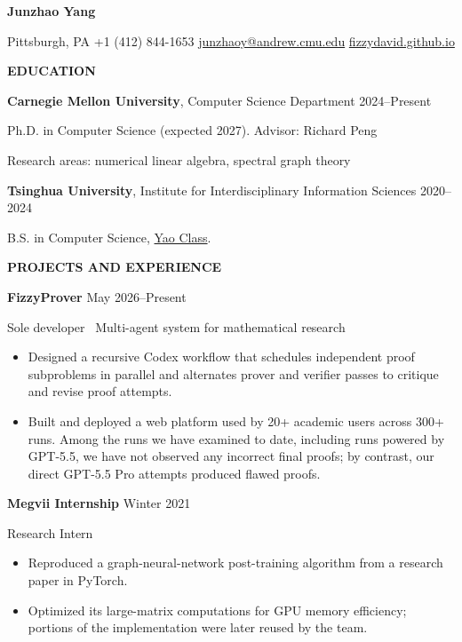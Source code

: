 \documentclass[11pt,letterpaper]{article}
\newcommand{\ressection}[1]{%
  \par\vspace{6pt}
  {\color{accent}\bfseries\fontsize{10.5}{12.5}\selectfont\MakeUppercase{#1}}\par
  \vspace{2pt}{\color{rulecolor}\hrule height 0.5pt}\vspace{4pt}
}
\newcommand{\resdate}[1]{{\small\color{muted}#1}}
\begin{document}
{\fontsize{20}{23}\selectfont\bfseries Junzhao Yang}\par
\vspace{3pt}
{
\small Pittsburgh, PA \enspace\textbar\enspace
+1 (412) 844-1653
  \enspace\textbar\enspace \href{mailto:junzhaoy@andrew.cmu.edu}{junzhaoy@andrew.cmu.edu}
  \enspace\textbar\enspace \href{https://fizzydavid.github.io/}{fizzydavid.github.io}}\par

\ressection{Education}
\textbf{Carnegie Mellon University}, Computer Science Department
\hfill \resdate{2024--Present}\par
Ph.D. in Computer Science (expected 2027). Advisor: Richard Peng \par
Research areas: numerical linear algebra, spectral graph theory \par
\vspace{3pt}
\textbf{Tsinghua University}, Institute for Interdisciplinary Information Sciences
\hfill \resdate{2020--2024}\par
B.S. in Computer Science, \href{https://iiis.tsinghua.edu.cn/en/yaoclass/}{Yao Class}.\par

\ressection{Projects and Experience}
\textbf{FizzyProver} \hfill \resdate{May 2026--Present}\par
{\small\color{muted}Sole developer \textperiodcentered\ Multi-agent system for mathematical research}\par
\begin{itemize}[leftmargin=1.25em,topsep=2pt,itemsep=1pt,parsep=0pt]
  \small
  \item Designed a recursive Codex workflow that schedules independent proof subproblems in parallel and alternates prover and verifier passes to critique and revise proof attempts.
  \item Built and deployed a web platform used by 20+ academic users across 300+ runs. Among the runs we have examined to date, including runs powered by GPT-5.5, we have not observed any incorrect final proofs; by contrast, our direct GPT-5.5 Pro attempts produced flawed proofs.
\end{itemize}

\textbf{Megvii Internship} \hfill \resdate{Winter 2021}\par
{\small\color{muted}Research Intern}\par
\begin{itemize}[leftmargin=1.25em,topsep=2pt,itemsep=1pt,parsep=0pt]
  \small
  \item Reproduced a graph-neural-network post-training algorithm from a research paper in PyTorch.
  \item Optimized its large-matrix computations for GPU memory efficiency; portions of the implementation were later reused by the team.
\end{itemize}
\end{document}
